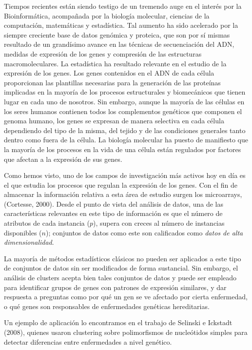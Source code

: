 Tiempos recientes están siendo testigo de un tremendo auge en el interés por la Bioinformática, acompañada por la biología molecular, ciencias de la computación, matemáticas y estadística. Tal aumento ha sido acelerado por la siempre creciente base de datos genómica y proteica, que son por sí mismas resultado de un grandísimo avance en las técnicas de secuenciación del ADN, medidas de expresión de los genes y compresión de las estructuras macromoleculares. La estadística ha resultado relevante en el estudio de la expresión de los genes. Los genes contenidos en el ADN de cada célula proporcionan las plantillas necesarias para la generación de las proteínas implicadas en la mayoría de los procesos estructurales y biomecánicos que tienen lugar en cada uno de nosotros. Sin embargo, aunque la mayoría de las células en los seres humanos contienen todos los complementos genéticos que componen el genoma humano, los genes se expresan de manera selectiva en cada célula dependiendo del tipo de la misma, del tejido y de las condiciones generales tanto dentro como fuera de la célula. La biología molecular ha puesto de manifiesto que la mayoría de los procesos en la vida de una célula están regulados por factores que afectan a la expresión de sus genes.

Como hemos visto, uno de los campos de investigación más activos hoy en día es el que estudia los procesos que regulan la expresión de los genes. Con el fin de almacenar la información relativa a esta área de estudio surgen los microarrays, (Cortesse, 2000). Desde el punto de vista del análisis de datos, una de las características relevantes en este tipo de información es que el número de atributos de cada instancia ($p$), supera con creces al número de instancias disponibles ($n$); conjuntos de datos como este son calificados como \textit{datos de alta dimensionalidad}.

La mayoría de métodos estadísticos clásicos no pueden ser aplicados a este tipo de conjuntos de datos sin ser modificados de forma sustancial. Sin embargo, el análisis de clusters acepta bien tales conjuntos de datos y puede ser empleado para identificar grupos de genes con patrones de expresión similares, y dar respuesta a preguntas como por qué un gen se ve afectado por cierta enfermedad, o qué genes son responsables de enfermedades genéticas hereditarias.

Un ejemplo de aplicación lo encontramos en el trabajo de Selinski e Ickstadt (2008), quienes usaron clustering sobre polimorfismos de nucleótidos simples para detectar diferencias entre enfermedades a nivel genético.


